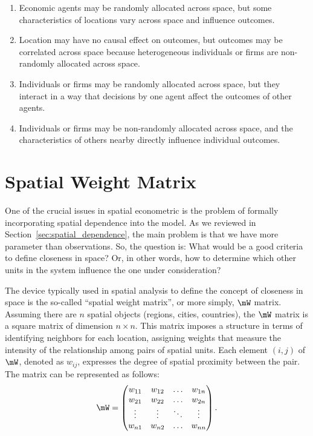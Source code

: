 \begin{enumerate}
    \item Economic agents may be randomly allocated across space, but some characteristics of locations vary across space and influence outcomes.
    \item Location may have no causal effect on outcomes, but outcomes may be correlated across space because heterogeneous individuals or firms are non-randomly allocated across space.
    \item Individuals or firms may be randomly allocated across space, but they interact in a way that decisions by one agent affect the outcomes of other agents.
    \item Individuals or firms may be non-randomly allocated across space, and the characteristics of others nearby directly influence individual outcomes.
\end{enumerate}

\section{Spatial Weight Matrix}

One of the crucial issues in spatial econometric is the problem of formally incorporating spatial dependence into the model. As we reviewed in Section~\ref{sec:spatial_dependence}, the main problem is that we have more parameter than observations. So, the question is: What would be a good criteria to define closeness in space? Or, in other words, how to determine which other units in the system influence the one under consideration?

The device typically used in spatial analysis to define the concept of closeness in space is the so-called ``spatial weight matrix'', or more simply, $\mW$ matrix. Assuming there are $n$ spatial objects (regions, cities, countries), the $\mW$ matrix is a square matrix of dimension $n \times n$. This matrix imposes a structure in terms of identifying neighbors for each location, assigning weights that measure the intensity of the relationship among pairs of spatial units. Each element $(i,j)$ of $\mW$, denoted as $w_{ij}$, expresses the degree of spatial proximity between the pair. The matrix can be represented as follows:
\begin{equation*}
\mW = \begin{pmatrix}
        w_{11} & w_{12} & \hdots & w_{1n} \\ 
        w_{21} & w_{22} & \hdots & w_{2n} \\
        \vdots & \vdots & \ddots & \vdots \\
        w_{n1} & w_{n2} & \hdots & w_{nn} 
      \end{pmatrix}.
\end{equation*}

